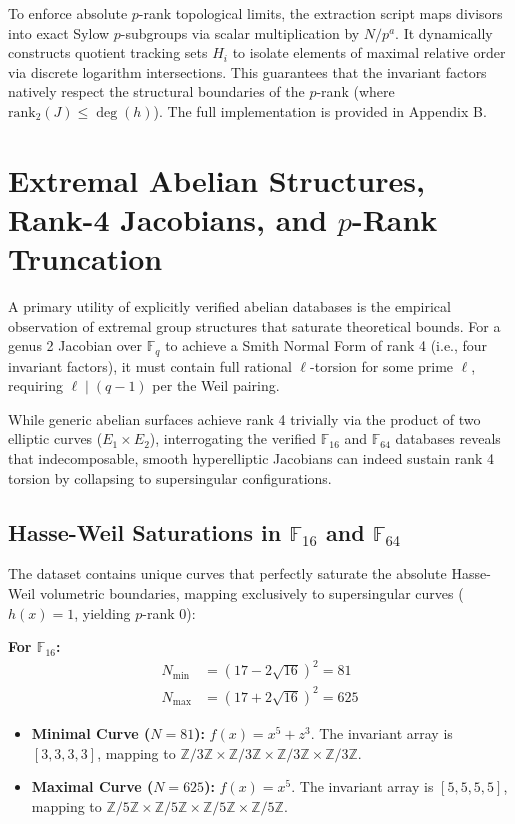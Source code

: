 \documentclass[letterpaper, 11pt]{article}
\begin{document}
To enforce absolute $p$-rank topological limits, the extraction script maps divisors into exact Sylow $p$-subgroups via scalar multiplication by $N/p^a$. It dynamically constructs quotient tracking sets $H_i$ to isolate elements of maximal relative order via discrete logarithm intersections. This guarantees that the invariant factors natively respect the structural boundaries of the $p$-rank (where $\text{rank}_2(J) \le \deg(h)$). The full implementation is provided in Appendix B.

\section{Extremal Abelian Structures, Rank-4 Jacobians, and $p$-Rank Truncation}
A primary utility of explicitly verified abelian databases is the empirical observation of extremal group structures that saturate theoretical bounds. For a genus 2 Jacobian over $\mathbb{F}_q$ to achieve a Smith Normal Form of rank 4 (i.e., four invariant factors), it must contain full rational $\ell$-torsion for some prime $\ell$, requiring $\ell \mid (q-1)$ per the Weil pairing. 

While generic abelian surfaces achieve rank 4 trivially via the product of two elliptic curves ($E_1 \times E_2$), interrogating the verified $\mathbb{F}_{16}$ and $\mathbb{F}_{64}$ databases reveals that indecomposable, smooth hyperelliptic Jacobians can indeed sustain rank 4 torsion by collapsing to supersingular configurations. 

\subsection{Hasse-Weil Saturations in $\mathbb{F}_{16}$ and $\mathbb{F}_{64}$}
The dataset contains unique curves that perfectly saturate the absolute Hasse-Weil volumetric boundaries, mapping exclusively to supersingular curves ($h(x) = 1$, yielding $p$-rank 0):

\textbf{For $\mathbb{F}_{16}$:}
\begin{align*}
    N_{\text{min}} &= (17 - 2\sqrt{16})^2 = 81 \\
    N_{\text{max}} &= (17 + 2\sqrt{16})^2 = 625
\end{align*}
\begin{itemize}
    \item \textbf{Minimal Curve ($N=81$):} $f(x) = x^5 + z^3$. The invariant array is $[3, 3, 3, 3]$, mapping to $\mathbb{Z}/3\mathbb{Z} \times \mathbb{Z}/3\mathbb{Z} \times \mathbb{Z}/3\mathbb{Z} \times \mathbb{Z}/3\mathbb{Z}$.
    \item \textbf{Maximal Curve ($N=625$):} $f(x) = x^5$. The invariant array is $[5, 5, 5, 5]$, mapping to $\mathbb{Z}/5\mathbb{Z} \times \mathbb{Z}/5\mathbb{Z} \times \mathbb{Z}/5\mathbb{Z} \times \mathbb{Z}/5\mathbb{Z}$.
\end{itemize}
\end{document}
